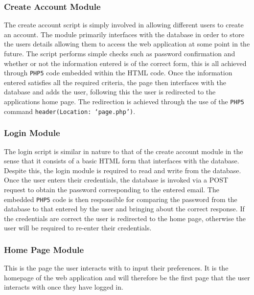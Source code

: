 \documentclass[10pt,twocolumn]{witseiepaper}
\begin{document}
		\subsubsection{Create Account Module}
		
		The create account script is simply involved in allowing different users to create an account. The module primarily interfaces with the database in order to store the users details allowing them to access the web application at some point in the future. The script performs simple checks such as password confirmation and whether or not the information entered is of the correct form, this is all achieved through \texttt{PHP5} code embedded within the HTML code. Once the information entered satisfies all the required criteria, the page then interfaces with the database and adds the user, following this the user is redirected to the applications home page. The redirection is achieved through the use of the \texttt{PHP5} command \texttt{header(Location: `page.php')}. 
		
		\subsubsection{Login Module}
		
		The login script is similar in nature to that of the create account module in the sense that it consists of a basic HTML form that interfaces with the database. Despite this, the login module is required to read and write from the database. \\
		
		Once the user enters their credentials, the database is invoked via a POST request to obtain the password corresponding to the entered email. The embedded \texttt{PHP5} code is then responsible for comparing the password from the database to that entered by the user and bringing about the correct response. If the credentials are correct the user is redirected to the home page, otherwise the user will be required to re-enter their credentials.
		
		\subsubsection{Home Page Module}
		
		This is the page the user interacts with to input their preferences. It is the homepage of the web application and will therefore be the first page that the user interacts with once they have logged in.\\
		
\end{document}
